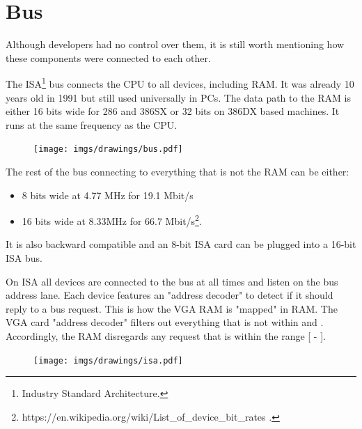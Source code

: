 \documentclass[book.tex]{subfiles}
\begin{document}
\section{Bus}
Although developers had no control over them, it is still worth mentioning how these components were connected to each other.\\ 
\par

The ISA\footnote{Industry Standard Architecture.} bus connects the CPU to all devices, including RAM. It was already 10 years old in 1991 but still used universally in PCs. The data path to the RAM is either 16 bits wide for 286 and 386SX or 32 bits on 386DX based machines. It runs at the same frequency as the CPU.\\
\par

\begin{figure}[H]
\centering
      \texttt{[image: imgs/drawings/bus.pdf]}
\end{figure}
\pagebreak
The rest of the bus connecting to everything that is not the RAM can be either:
\begin{itemize}
\item 8 bits wide at 4.77 MHz  for 19.1 Mbit/s
\item 16 bits wide at 8.33MHz for 66.7 Mbit/s\footnote{https://en.wikipedia.org/wiki/List\_of\_device\_bit\_rates .}.
\end{itemize}
It is also backward compatible and an 8-bit ISA card can be plugged into a 16-bit ISA bus.\\
\par
\vspace{10pt}
 On ISA all devices are connected to the bus at all times and listen on the bus address lane. Each device features an "address decoder" to detect if it should reply to a bus request. This is how the VGA RAM is "mapped" in RAM. The VGA card "address decoder"  filters out everything that is not within  and . Accordingly, the RAM disregards any request that is within the range [ - ].\\
\par
 \begin{figure}[H]
\centering
\texttt{[image: imgs/drawings/isa.pdf]}
\end{figure}
\end{document}
